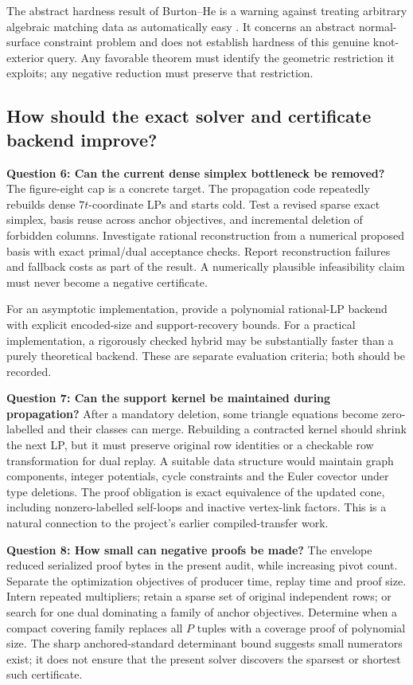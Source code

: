 The abstract hardness result of Burton--He is a warning against treating arbitrary algebraic matching data as automatically easy \cite{BurtonHe}. It concerns an abstract normal-surface constraint problem and does not establish hardness of this genuine knot-exterior query. Any favorable theorem must identify the geometric restriction it exploits; any negative reduction must preserve that restriction.

\subsection{How should the exact solver and certificate backend improve?}

\textbf{Question 6: Can the current dense simplex bottleneck be removed?}
The figure-eight cap is a concrete target. The propagation code repeatedly rebuilds dense $7t$-coordinate LPs and starts cold. Test a revised sparse exact simplex, basis reuse across anchor objectives, and incremental deletion of forbidden columns. Investigate rational reconstruction from a numerical proposed basis with exact primal/dual acceptance checks. Report reconstruction failures and fallback costs as part of the result. A numerically plausible infeasibility claim must never become a negative certificate.

For an asymptotic implementation, provide a polynomial rational-LP backend with explicit encoded-size and support-recovery bounds. For a practical implementation, a rigorously checked hybrid may be substantially faster than a purely theoretical backend. These are separate evaluation criteria; both should be recorded.

\textbf{Question 7: Can the support kernel be maintained during propagation?}
After a mandatory deletion, some triangle equations become zero-labelled and their classes can merge. Rebuilding a contracted kernel should shrink the next LP, but it must preserve original row identities or a checkable row transformation for dual replay. A suitable data structure would maintain graph components, integer potentials, cycle constraints and the Euler covector under type deletions. The proof obligation is exact equivalence of the updated cone, including nonzero-labelled self-loops and inactive vertex-link factors. This is a natural connection to the project's earlier compiled-transfer work.

\textbf{Question 8: How small can negative proofs be made?}
The envelope reduced serialized proof bytes in the present audit, while increasing pivot count. Separate the optimization objectives of producer time, replay time and proof size. Intern repeated multipliers; retain a sparse set of original independent rows; or search for one dual dominating a family of anchor objectives. Determine when a compact covering family replaces all $P$ tuples with a coverage proof of polynomial size. The sharp anchored-standard determinant bound suggests small numerators exist; it does not ensure that the present solver discovers the sparsest or shortest such certificate.

